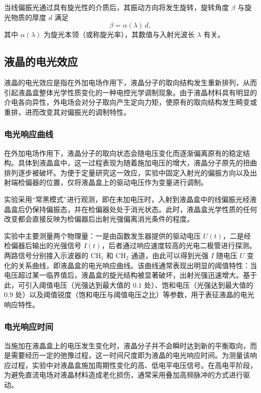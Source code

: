 \documentclass[a4paper, 1.5lines]{ctexart}
\begin{document}
当线偏振光通过具有旋光性的介质后，其振动方向将发生旋转，旋转角度 $\beta$ 与旋光物质的厚度 $d$ 满足
\begin{equation}
    \beta = \alpha(\lambda)\, d ,
\end{equation}
其中 $\alpha(\lambda)$ 为旋光本领（或称旋光率），其数值与入射光波长 $\lambda$ 有关。
\subsection{液晶的电光效应}

液晶的电光效应是指在外加电场作用下，液晶分子的取向结构发生重新排列，从而引起液晶盒整体光学性质变化的一种电控光学调制现象。由于液晶材料具有明显的介电各向异性，外电场会对分子取向产生定向力矩，使原有的取向结构发生畸变或重排，进而改变其对偏振光的调制特性。

\subsubsection{电光响应曲线}

在外加电场作用下，液晶分子的取向状态会随电压变化而逐渐偏离原有的稳定结构。具体到液晶盒中，这一过程表现为随着施加电压的增大，液晶分子原先的扭曲排列逐步被破坏。为便于定量研究这一效应，实验中固定入射光的偏振方向以及出射端检偏器的位置，仅将液晶盒上的驱动电压作为变量进行调制。

实验采用“常黑模式”进行观测，即在未加电压时，入射到液晶盒中的线偏振光经液晶盒后仍保持偏振态，并在检偏器处处于消光状态。此时，液晶盒光学性质的任何改变都会直接反映为检偏器后出射光强偏离消光条件的程度。

实验中主要测量两个物理量：一是由函数发生器提供的驱动电压 $U(t)$，二是经检偏器后输出的光强信号 $I(t)$，后者通过响应速度较高的光电二极管进行探测。两路信号分别接入示波器的 CH$_1$ 和 CH$_2$ 通道，由此可以得到光强 $I$ 随电压 $U$ 变化的关系曲线，即液晶盒的电光响应曲线。该曲线通常表现出明显的阈值特性：当电压超过某一临界值后，液晶盒的旋光结构被显著破坏，出射光强迅速增大。基于此，可引入阈值电压（光强达到最大值的 $0.1$ 处）、饱和电压（光强达到最大值的 $0.9$ 处）以及阈值锐度（饱和电压与阈值电压之比）等参数，用于表征液晶的电光响应特性。

\subsubsection{电光响应时间}

当施加在液晶盒上的电压发生变化时，液晶分子并不会瞬时达到新的平衡取向，而是需要经历一定的弛豫过程，这一时间尺度即为液晶的电光响应时间。为测量该响应过程，实验中对液晶盒施加周期性变化的高、低电平电压信号。在高电平阶段，为避免直流电场对液晶材料造成老化损伤，通常采用叠加高频脉冲的方式进行驱动。
\end{document}
